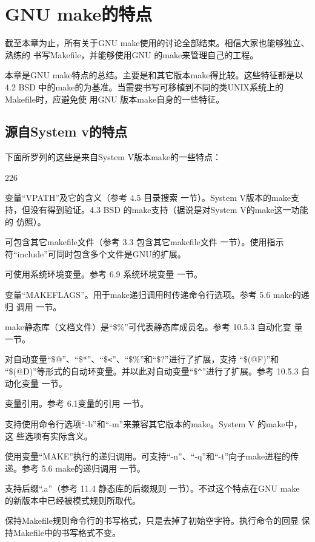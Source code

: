 ﻿\chapter{GNU make的特点}
截至本章为止，所有关于GNU make使用的讨论全部结束。相信大家也能够独立、熟练的
书写Makefile，并能够使用GNU 的make来管理自己的工程。

本章是GNU make特点的总结。主要是和其它版本make得比较。这些特征都是以4.2 BSD
中的make的为基准。当需要书写可移植到不同的类UNIX系统上的Makefile时，应避免使
用GNU 版本make自身的一些特征。

\section{源自System v的特点}
下面所罗列的这些是来自System V版本make的一些特点：

\begin{dinglist}{226}
\itemsep=4pt

\item 变量“VPATH”及它的含义（参考 4.5 目录搜索 一节）。System V版本的make支
    持，但没有得到验证。4.3 BSD 的make支持（据说是对System V的make这一功能的
    仿照）。

\item 可包含其它makefile文件（参考 3.3 包含其它makefile文件 一节）。使用指示
    符“include”可同时包含多个文件是GNU的扩展。

\item 可使用系统环境变量。参考 6.9 系统环境变量 一节。

\item 变量“MAKEFLAGS”。用于make递归调用时传递命令行选项。参考 5.6 make的递归
    调用 一节。

\item  make静态库（文档文件）是“\$\%”可代表静态库成员名。参考 10.5.3 自动化变
    量 一节。

\item 对自动变量“\$@”、“\$*”、“\$\verb"<"”、“\$\%”和“\$?”进行了扩展，支持
    “\$(@F)”和
    “\$(@D)”等形式的自动环变量。并以此对自动变量“\$\verb"^"”进行了扩展。参考 10.5.3 自
    动化变量 一节。

\item 变量引用。参考 6.1变量的引用 一节。

\item 支持使用命令行选项“-b”和“-m”来兼容其它版本的make。System V 的make中，这
    些选项有实际含义。

\item 使用变量“MAKE”执行的递归调用。可支持“-n”、“-q”和“-t”向子make进程的传
    递。参考  5.6 make的递归调用 一节。

\item 支持后缀“.a”（参考 11.4 静态库的后缀规则 一节）。不过这个特点在GNU make
    的新版本中已经被模式规则所取代。

\item 保持Makefile规则命令行的书写格式，只是去掉了初始空字符。执行命令的回显
    保持Makefile中的书写格式不变。

\end{dinglist}

